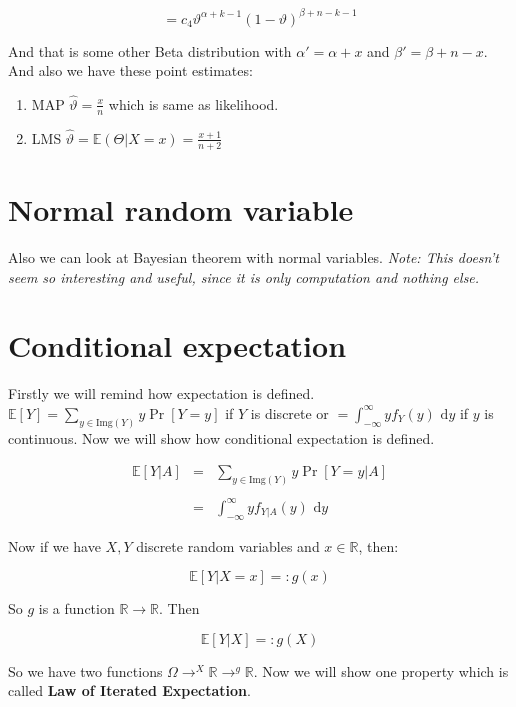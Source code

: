 $$
= c_{4} \vartheta^{\alpha + k -1}(1 - \vartheta)^{\beta + n - k -1}
$$

And that is some other Beta distribution with $\alpha' = \alpha + x$ and $\beta' = \beta + n - x$. And also we have these point estimates:

\begin{enumerate}
	\item MAP $\hat{\vartheta} = \frac{x}{n}$ which is same as likelihood.
	\item LMS $\hat{\vartheta} = \mathbb{E}(\Theta \vert X = x) = \frac{x+1}{n+2}$
\end{enumerate}

\section{Normal random variable}

Also we can look at Bayesian theorem with normal variables. \textit{Note: This doesn't seem so interesting and useful, since it is only computation and nothing else.}


\section{Conditional expectation}

Firstly we will remind how expectation is defined. $\mathbb{E}[Y] = \sum_{y \in \text{Img}(Y)} y \Pr[Y = y]$ if $Y$ is discrete or $= \int_{-\infty}^{\infty} y f_{Y}(y) \text{ d}y$ if $y$ is continuous. Now we will show how conditional expectation is defined.

$$
\begin{array}{rcl}
\mathbb{E}[Y \vert A] & = & \sum_{y \in \text{Img}(Y)}y \Pr[Y = y \vert A] \\ \\
& = & \int_{-\infty}^{\infty} y f_{Y \vert A}(y) \text{ d}y
\end{array}
$$

Now if we have $X,Y$ discrete random variables and $x \in \mathbb{R}$, then:

$$
\mathbb{E}[Y \vert X = x] =: g(x)
$$

So $g$ is a function $\mathbb{R} \to \mathbb{R}$. Then

$$
\mathbb{E} [Y \vert X] =: g(X)
$$

So we have two functions $\Omega \to^{X} \mathbb{R} \to^{g} \mathbb{R}$. Now we will show one property which is called \textbf{Law of Iterated Expectation}.

